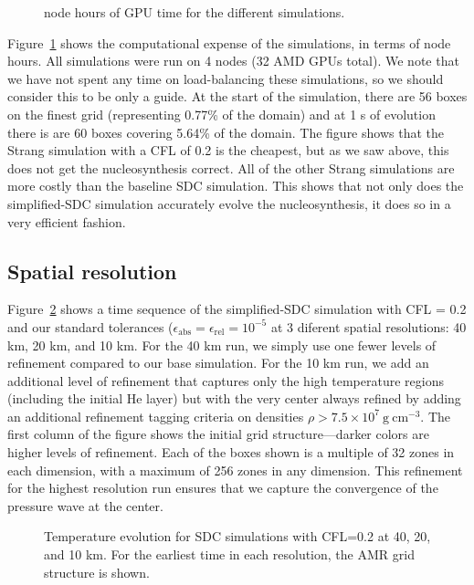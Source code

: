 \documentclass[modern]{aastex631}
\newcommand{\gcc}{\mathrm{g~cm^{-3} }}
\begin{document}
\begin{figure}[t]
\centering
{}
\caption{\label{fig:cpu} node hours of GPU time for the different simulations.}
\end{figure}




Figure~\ref{fig:cpu} shows the computational expense of the
simulations, in terms of node hours.  All simulations were run on 4
nodes (32 AMD GPUs total).  We note that we have not spent any time on
load-balancing these simulations, so we should consider this to be
only a guide.  At the start of the simulation, there are 56 boxes on
the finest grid (representing 0.77\% of the domain) and at 1 s of
evolution there is are 60 boxes covering 5.64\% of the domain.  The
figure shows that the Strang simulation with a CFL of 0.2 is the
cheapest, but as we saw above, this does not get the nucleosynthesis
correct.  All of the other Strang simulations are more costly than the
baseline SDC simulation.  This shows that not only does the
simplified-SDC simulation accurately evolve the nucleosynthesis, it
does so in a very efficient fashion.

\subsection{Spatial resolution}

Figure~\ref{fig:res_panel} shows a time sequence of the simplified-SDC
simulation with CFL = 0.2 and our standard tolerances
($\epsilon_\mathrm{abs} = \epsilon_\mathrm{rel} = 10^{-5}$ at 3
diferent spatial resolutions: 40 km, 20 km, and 10 km.  For the 40 km
run, we simply use one fewer levels of refinement compared to our base
simulation.  For the 10 km run, we add an additional level of
refinement that captures only the high temperature regions (including
the initial He layer) but with the very center always refined by
adding an additional refinement tagging criteria on densities $\rho >
7.5\times 10^7~\gcc$.  The first column of the figure shows the
initial grid structure---darker colors are higher levels of
refinement.  Each of the boxes shown is a multiple of 32 zones in each
dimension, with a maximum of 256 zones in any dimension.  This
refinement for the highest resolution run ensures that we capture the
convergence of the pressure wave at the center.  

\begin{figure}[t]
\centering
{}
\caption{\label{fig:res_panel} Temperature evolution for SDC simulations with CFL=0.2 at 40, 20, and 10 km.  For the earliest time
  in each resolution, the AMR grid structure is shown.}
\end{figure}
\end{document}

